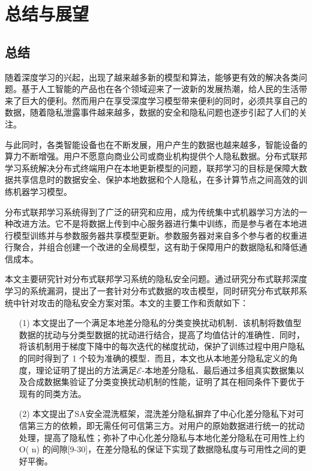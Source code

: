 \chapter{总结与展望}
\label{ch6}
\section{总结}
随着深度学习的兴起，出现了越来越多新的模型和算法，能够更有效的解决各类问题。基于人工智能的产品也在各个领域迎来了一波新的发展热潮，给人民的生活带来了巨大的便利。然而用户在享受深度学习模型带来便利的同时，必须共享自己的数据，随着隐私泄露事件越来越多，数据的安全和隐私问题也逐步引起了人们的关注。 

与此同时，各类智能设备也在不断发展，用户产生的数据也越来越多，智能设备的算力不断增强。用户不愿意向商业公司或商业机构提供个人隐私数据。分布式联邦学习系统解决分布式终端用户在本地更新模型的问题，联邦学习的目标是保障大数据共享信息时的数据安全、保护本地数据和个人隐私，在多计算节点之间高效的训练机器学习模型。 

分布式联邦学习系统得到了广泛的研究和应用，成为传统集中式机器学习方法的一种改进方法。它不是将数据上传到中心服务器进行集中训练，而是参与者在本地进行模型训练并与参数服务器共享模型更新。参数服务器对来自多个参与者的权重进行聚合，并组合创建一个改进的全局模型，这有助于保障用户的数据隐私和降低通信成本。 

本文主要研究针对分布式联邦学习系统的隐私安全问题。通过研究分布式联邦深度学习的系统漏洞，提出了一套针对分布式数据的攻击模型，同时研究分布式联邦系统中针对攻击的隐私安全方案对策。本文的主要工作和贡献如下：
\begin{enumerate}
\item [(1)] 本文提出了一个满足本地差分隐私的分类变换扰动机制．该机制将数值型数据的扰动与分类型数据的扰动进行结合，提高了均值估计的准确性．同时，将该机制用于梯度下降中的每次迭代的梯度扰动，保护了训练过程中用户隐私的同时得到了 1 个较为准确的模型．而且，本文也从本地差分隐私定义的角度，理论证明了提出的方法满足$\mathcal{E}$-本地差分隐私．最后通过多组真实数据集以及合成数据集验证了分类变换扰动机制的性能，证明了其在相同条件下要优于现有的同类方法。

\item [(2)] 本文提出了SA安全混洗框架，混洗差分隐私摒弃了中心化差分隐私下对可信第三方的依赖，即无需任何可信第三方。对用户的原始数据进行统一的扰动处理，提高了隐私性；弥补了中心化差分隐私与本地化差分隐私在可用性上约O( n) 的间隙[9-30]，在差分隐私的保证下实现了数据隐私度与可用性之间的更好平衡。
\end{enumerate}

